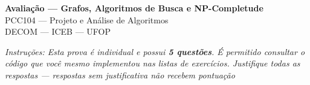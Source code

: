 \documentclass[10pt,a4paper]{extarticle}
\begin{document}
\begin{center}
    {\LARGE\bfseries Avaliação --- Grafos, Algoritmos de Busca e NP-Completude}\\[0.3cm]
    {\large PCC104 --- Projeto e Análise de Algoritmos}\\[0.15cm]
    {DECOM --- ICEB --- UFOP}\\[0.35cm]
\end{center}

\noindent

\small
\textit{Instruções: Esta prova é individual e possui \textbf{5 questões}. É permitido consultar o código que você mesmo implementou nas listas de exercícios. Justifique todas as respostas --- respostas sem justificativa não recebem pontuação}

\normalsize
\vspace{0.4cm}
\end{document}
